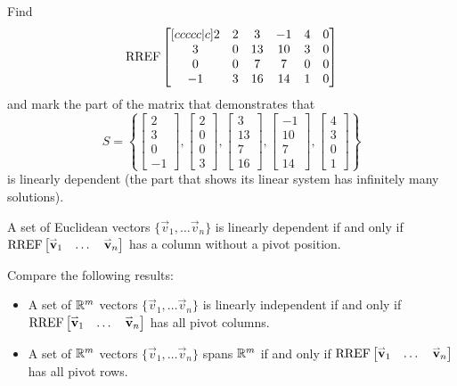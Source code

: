 \begin{activity}{10}
  Find
  \[\operatorname{RREF}\begin{bmatrix}[ccccc|c]
  2&2&3&-1&4&0\\
  3&0&13&10&3&0\\
  0&0&7&7&0&0\\
  -1&3&16&14&1&0
  \end{bmatrix}
  \]
  and mark the part of the matrix that demonstrates that
  \[S=\left\{
  \begin{bmatrix}2\\3\\0\\-1\end{bmatrix},
  \begin{bmatrix}2\\0\\0\\3\end{bmatrix},
  \begin{bmatrix}3\\13\\7\\16\end{bmatrix},
  \begin{bmatrix}-1\\10\\7\\14\end{bmatrix},
  \begin{bmatrix}4\\3\\0\\1\end{bmatrix}
  \right\}
  \]
  is linearly dependent (the part that shows its linear system has
  infinitely many solutions).
\end{activity}

\begin{quickcheck}
  A set of Euclidean vectors
  \(\{\vec v_1,\dots\vec v_n\}\) is linearly dependent if and only
  if \(\operatorname{RREF}\begin{bmatrix}\mathbf{\accentset{\rightharpoonup}{v}}_1&\dots&\mathbf{\accentset{\rightharpoonup}{v}}_n\end{bmatrix}\)
  has a column without a pivot position.
\end{quickcheck}


\begin{observation}
  Compare the following results:
  
  \begin{itemize}
  \item A set of \(\mathbb{R}^m\) vectors
  \(\{\vec v_1,\dots\vec v_n\}\) is linearly independent if and only
  if \(\operatorname{RREF}\begin{bmatrix}\mathbf{\accentset{\rightharpoonup}{v}}_1&\dots&\mathbf{\accentset{\rightharpoonup}{v}}_n\end{bmatrix}\)
  has all pivot columns.
  \item A set of \(\mathbb{R}^m\) vectors
  \(\{\vec v_1,\dots\vec v_n\}\) spans \(\mathbb{R}^m\) if and only
  if \(\operatorname{RREF}\begin{bmatrix}\mathbf{\accentset{\rightharpoonup}{v}}_1&\dots&\mathbf{\accentset{\rightharpoonup}{v}}_n\end{bmatrix}\)
  has all pivot rows.
  \end{itemize}
\end{observation}

